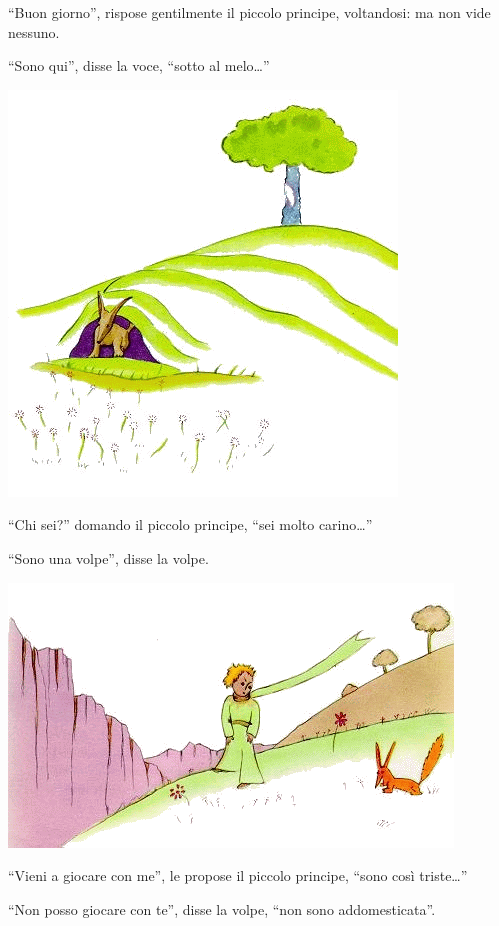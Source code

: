 \documentclass[11pt]{scrbook}
\begin{document}
``Buon giorno'', rispose gentilmente il piccolo principe, voltandosi: ma
non vide nessuno.

``Sono qui'', disse la voce, ``sotto al melo\ldots{}''

\begin{center}
\includegraphics{img/21b}
\end{center}

``Chi sei?'' domando il piccolo principe, ``sei molto carino\ldots{}''

``Sono una volpe'', disse la volpe.

\begin{center}
\includegraphics{img/21a}
\end{center}

``Vieni a giocare con me'', le propose il piccolo principe, ``sono così
triste\ldots{}''

``Non posso giocare con te'', disse la volpe, ``non sono
addomesticata''.
\end{document}
